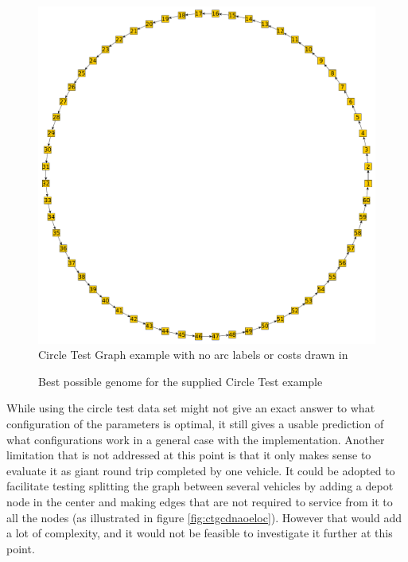 \begin{figure}[thbp]
	\centerline{\includegraphics[width=\textwidth]{figures/CircleTests/CircleTestIllustrations/Circle_Test_Graph-No_arc_labels_or_costs.pdf}}
	\caption{Circle Test Graph example with no arc labels or costs drawn in}
	\label{fig:ctgnaloc}
\end{figure}

\begin{figure}[thbp]
	\noindent
	\caption{Best possible genome for the supplied Circle Test example}
	\label{fig:bpgftscte}
\end{figure}

While using the circle test data set might not give an exact answer to what configuration of the parameters is optimal, it still gives a usable prediction of what configurations work in a general case with the implementation. Another limitation that is not addressed at this point is that it only makes sense to evaluate it as giant round trip completed by one vehicle. It could be adopted to facilitate testing splitting the graph between several vehicles by adding a depot node in the center and making edges that are not required to service from it to all the nodes (as illustrated in figure \ref{fig:ctgcdnaoeloc}). However that would add a lot of complexity, and it would not be feasible to investigate it further at this point.


